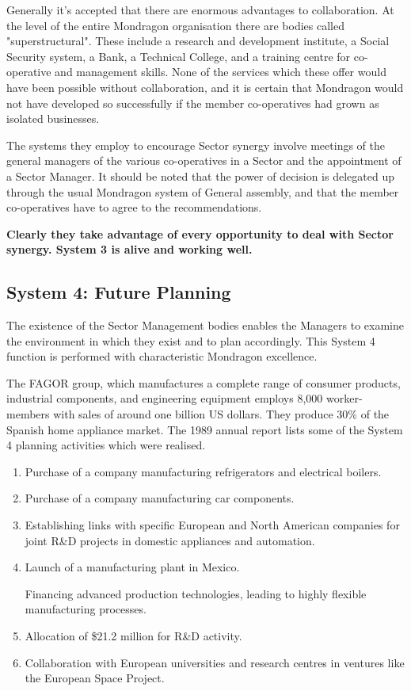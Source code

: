 Generally it's accepted that there are enormous advantages to collaboration. At the level of the entire Mondragon organisation there are bodies called "superstructural". These include a research and development institute, a Social Security system, a Bank, a Technical College, and a training centre for co-operative and management skills. None of the services which these offer would have been possible without collaboration, and it is certain that Mondragon would not have developed so successfully if the member co-operatives had grown as isolated businesses.

The systems they employ to encourage Sector synergy involve meetings of the general managers of the various co-operatives in a Sector and the appointment of a Sector Manager. It should be noted that the power of decision is delegated up through the usual Mondragon system of General assembly, and that the member co-operatives have to agree to the recommendations.

\textbf{Clearly they take advantage of every opportunity to deal with Sector synergy. System 3 is alive and working well.}

\subsection*{System 4: Future Planning}
The existence of the Sector Management bodies enables the Managers to examine the environment in which they exist and to plan accordingly. This System 4 function is performed with characteristic Mondragon excellence.

The FAGOR group, which manufactures a complete range of consumer products, industrial components, and engineering equipment employs 8,000 worker-members with sales of around one billion US dollars. They produce 30\% of the Spanish home appliance market. The 1989 annual report lists some of the System 4 planning activities which were realised.

\begin{enumerate}
  \item Purchase of a company manufacturing refrigerators and electrical boilers.

  \item Purchase of a company manufacturing car components.

  \item Establishing links with specific European and North American companies for joint R\&D projects in domestic appliances and automation.

  \item Launch of a manufacturing plant in Mexico.

Financing advanced production technologies, leading to highly flexible manufacturing processes.

  \item Allocation of \$21.2 million for R\&D activity.

  \item Collaboration with European universities and research centres in ventures like the European Space Project.

\end{enumerate}

